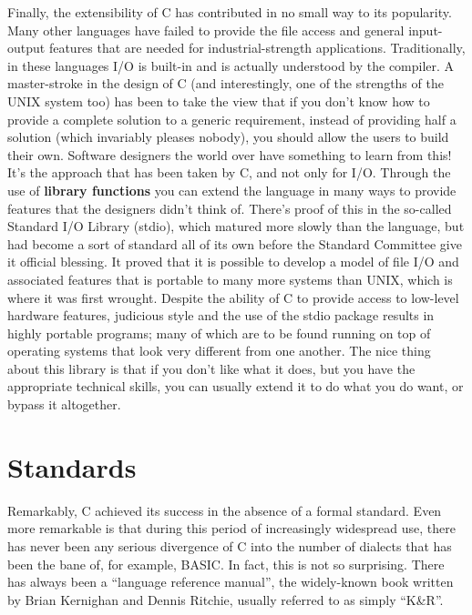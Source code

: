   Finally, the extensibility of C has contributed in no small way to its
   popularity. Many other languages have failed to provide the file access and
   general input-output features that are needed for industrial-strength
   applications. Traditionally, in these languages I/O is built-in and is
   actually understood by the compiler. A master-stroke in the design
   of C (and interestingly, one of the strengths of the UNIX system too)
   has been to take the view that if you don't know how to provide a complete
   solution to a generic requirement, instead of providing half a solution
   (which invariably pleases nobody), you should allow the users to build
   their own. Software designers the world over have something to learn from
   this! It's the approach that has been taken by C, and not only for I/O.
   Through the use of \textbf{library functions} you can extend the language
   in many ways to provide features that the designers didn't think of.
   There's proof of this in the so-called Standard I/O Library (stdio), which
   matured more slowly than the language, but had become a sort of standard
   all of its own before the Standard Committee give it official blessing. It
   proved that it is possible to develop a model of file I/O and associated
   features that is portable to many more systems than UNIX, which is where it
   was first wrought. Despite the ability of C to provide access to low-level
   hardware features, judicious style and the use of the stdio package results
   in highly portable programs; many of which are to be found running on top
   of operating systems that look very different from one another. The nice
   thing about this library is that if you don't like what it does, but you
   have the appropriate technical skills, you can usually extend it to do what
   you do want, or bypass it altogether.


 
        \section*{Standards}
        

  

  Remarkably, C achieved its success in the absence of a formal
   standard. Even more remarkable is that during this period of increasingly
   widespread use, there has never been any serious divergence of C into the
   number of dialects that has been the bane of, for example, BASIC. In fact,
   this is not so surprising. There has always been a ``language reference
   manual'', the widely-known book written by Brian Kernighan and Dennis
   Ritchie, usually referred to as simply ``K\&R''.


